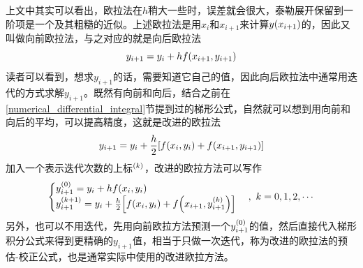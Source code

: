 \documentclass[12pt,a4paper,openany,twoside]{book}
\numberwithin{equation}{section}
\begin{document}
          上文中其实可以看出，欧拉法在$h$稍大一些时，误差就会很大，泰勒展开保留到一阶项是一个及其粗糙的近似。上述欧拉法是用$x_i$和$x_{i+1}$来计算$y\qty(x_{i+1})$的，因此又叫做向前欧拉法，与之对应的就是向后欧拉法
          \begin{equation}
            y_{i+1}=y_i+hf\qty(x_{i+1}, y_{i+1})
          \end{equation}
          读者可以看到，想求$y_{i+1}$的话，需要知道它自己的值，因此向后欧拉法中通常用迭代的方式求解$y_{i+1}$。既然有向前和向后，结合之前在\ref{numerical_differential_integral}节提到过的梯形公式，自然就可以想到用向前和向后的平均，可以提高精度，这就是改进的欧拉法
          \begin{equation*}
            y_{i+1}=y_i+\frac{h}{2}\qty[f\qty(x_i,y_i)+f\qty(x_{i+1},y_{i+1})]
          \end{equation*}
          加入一个表示迭代次数的上标$^\qty(k)$，改进的欧拉方法可以写作
          \begin{equation}
            \begin{cases}
              y_{i+1}^\qty(0)=y_i+hf\qty(x_i,y_i)\\
              y_{i+1}^\qty(k+1)=y_i+\frac{h}{2}\qty[f\qty(x_i,y_i)+f\qty(x_{i+1},y_{i+1}^\qty(k))]
            \end{cases},\ k=0,1,2,\cdots
          \end{equation}
          另外，也可以不用迭代，先用向前欧拉方法预测一个$y_{i+1}^\qty(0)$的值，然后直接代入梯形积分公式来得到更精确的$y_{i+1}$值，相当于只做一次迭代，称为改进的欧拉法的预估-校正公式，也是通常实际中使用的改进欧拉方法。
\end{document}
